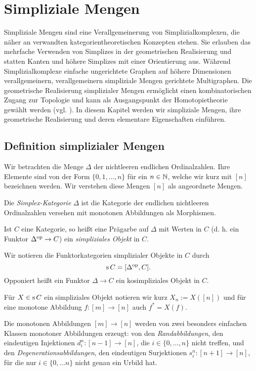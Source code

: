 
\chapter{Simpliziale Mengen}
\label{ch:simp-sets}

Simpliziale Mengen sind eine Verallgemeinerung von
Simplizialkomplexen, die näher an verwandten kategorientheoretischen
Konzepten stehen. Sie erlauben das mehrfache Verwenden von Simplizes
in der geometrischen Realisierung und statten Kanten und höhere
Simplizes mit einer Orientierung aus. Während Simplizialkomplexe
einfache ungerichtete Graphen auf höhere Dimensionen verallgemeinern,
verallgemeinern simpliziale Mengen gerichtete Multigraphen. Die
geometrische Realisierung simplizialer Mengen ermöglicht einen
kombinatorischen Zugang zur Topologie und kann als Ausgangspunkt der
Homotopietheorie gewählt werden (vgl. \cite{GJ}). In diesem Kapitel
werden wir simpliziale Mengen, ihre geometrische Realisierung und
deren elementare Eigenschaften einführen.

\section{Definition simplizialer Mengen}

Wir betrachten die Menge $\Delta$ der nichtleeren endlichen
Ordinalzahlen. Ihre Elemente sind von der Form $\{0, 1, \dots, n\}$
für ein $n \in \mathbb{N}$, welche wir kurz mit $[n]$ bezeichnen werden. Wir
verstehen diese Mengen $[n]$ als angeordnete Mengen.

\begin{defn} \label{def:delta}
  Die \emph{Simplex-Kategorie} $\Delta$ ist die Kategorie der
  endlichen nichtleeren Ordinalzahlen versehen mit monotonen
  Abbildungen als Morphismen.

  Ist $C$ eine Kategorie, so heißt eine Prägarbe auf $\Delta$ mit
  Werten in $C$ (d. h. ein Funktor $\Delta^\mathrm{op} \to C$) ein
  \emph{simpliziales Objekt} in $C$.
\end{defn}
Wir notieren die Funktorkategorien simplizialer Objekte in $C$ durch
\[ \operatorname{s} C = [\Delta^\mathrm{op}, C] . \]
Opponiert heißt ein Funktor $\Delta \to C$ ein kosimpliziales Objekt
in $C$.

Für $X \in \operatorname{s} C$ ein simpliziales Objekt notieren wir kurz $X_n :=
X([n])$ und für eine monotone Abbildung $f: [m] \to [n]$ auch $f^* =
X(f)$.

Die monotonen Abbildungen $[m] \to [n]$ werden von zwei besonders
einfachen Klassen monotoner Abbildungen erzeugt: von den
\emph{Randabbildungen}, den eindeutigen Injektionen $d_i^n: [n - 1]
\to [n]$, die $i \in \{0, \dots, n\}$ nicht treffen, und den
\emph{Degenerationsabbildungen}, den eindeutigen Surjektionen $s_i^n:
     [n + 1] \to [n]$, für die nur $i \in \{0, \dots n\}$ nicht genau
     ein Urbild hat.
 
